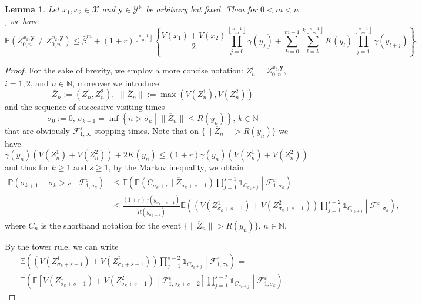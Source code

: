 \documentclass[a4paper,10pt]{article}
\newtheorem{lemma}[theorem]{Lemma}
\newcommand{\N}{\mathbb{N}}
\newcommand{\F}{\mathcal{F}}
\newcommand{\X}{\mathcal{X}}
\newcommand{\Y}{\mathcal{Y}}
\renewcommand{\P}{\mathbb{P}}
\newcommand{\E}{\mathbb{E}}
\newcommand{\ind}{\mathds{1}}
\newcommand{\eps}{\varepsilon}
\newcommand{\ga}{\gamma}
\newcommand{\lfrf}[1]{\left\lfloor #1\right\rfloor}
\begin{document}
\begin{lemma}\label{lem:coupling}
	Let $x_1,x_2\in\X$ and $\mathbf{y}\in\Y^\N$ be arbitrary but fixed. Then for $0<m<n$, we have
	$$
	\P (Z_{0,n}^{x_1,\mathbf{y}} \ne Z_{0,n}^{x_2,\mathbf{y}})
	\le
	\bar{\beta}^m
	+
	(1+r)^{\lfrf{\frac{n-1}{m}}}\left\{
	\frac{V(x_1)+V(x_2)}{2}\prod_{j=0}^{\lfrf{\frac{n-1}{m}}}\ga (y_j)
	+
	\sum_{k=0}^{m-1}\sum_{l=k}^{k\lfrf{\frac{n-1}{m}}} K(y_l)\prod_{j=1}^{\lfrf{\frac{n-1}{m}}}\ga (y_{l+j})
	\right\}.
	$$
\end{lemma}
\begin{proof}
	For the sake of brevity, we employ a more concise notation: $Z_n^i=Z_{0,n}^{x_i,\mathbf{y}}$, $i=1,2$, and $n\in\N$, moreover we introduce
	$$
	\overline{Z}_{n}:=\left(Z_n^1,Z_n^2\right), \,\,
	\lVert \overline{Z}_{n}\rVert:=\max \left( V(Z_n^1), V(Z_n^2) \right)
	$$ 
	and the sequence of successive visiting times
	$$
	\sigma_0:=0,\,\sigma_{k+1} = \inf\left\{n>\sigma_k\middle|  \lVert \overline{Z}_n\rVert\le 
	R(y_n)
	\right\},\,k\in\N
	$$
	that are obviously $\F_{1,\infty}^\eps$-stopping times. Note that on 
	$\{ \lVert \overline{Z}_n\rVert>R (y_n)\}$ we have 
	\begin{equation}\label{eq:contr}
	\ga (y_n) (V( Z_n^1)+V( Z_n^2))+2K(y_n)
	\le
	(1+r)\ga (y_n) (V( Z_n^1)+V( Z_n^2))
	\end{equation}
	and thus for $k\ge 1$ and $s\ge 1$, by the Markov inequality, we obtain
	\begin{align*}
	\P (\sigma_{k+1}-\sigma_{k}>s\mid \F_{1,\sigma_k}^\eps)
	&\le 
	\E \left(
	\P (C_{\sigma_k+s}\mid \overline{Z}_{\sigma_{k}+s-1})
	\prod_{j=1}^{s-1}
	\ind_{C_{\sigma_k+j}}
	\middle| \F_{1,\sigma_k}^\eps\right)\\
	&\le 
	\frac{(1+r)\ga (y_{\sigma_k+s-1})}{R(y_{\sigma_k+s})}
	\E \left(
	\left(V( Z_{\sigma_k+s-1}^1)+V( Z_{\sigma_k+s-1}^2)\right)
	\prod_{j=1}^{s-2}
	\ind_{C_{\sigma_k+j}}
	\middle| \F_{1,\sigma_k}^\eps\right),
	\end{align*}
	where $C_n$ is the shorthand notation for the event $\{\lVert \overline{Z}_n\rVert> 
	R(y_n)\}$, $n\in\N$. 
	
	By the tower rule, we can write
	\begin{multline*}
		\E \left(
		\left(V( Z_{\sigma_k+s-1}^1)+V( Z_{\sigma_k+s-1}^2)\right)
		\prod_{j=1}^{s-2}
		\ind_{C_{\sigma_k+j}}
		\middle| \F_{1,\sigma_k}^\eps\right)
		=\\
		\E \left(
		\E\left[V( Z_{\sigma_k+s-1}^1)+V( Z_{\sigma_k+s-1}^2)\middle|\F_{1,\sigma_{k}+s-2}^\eps\right]
		\prod_{j=1}^{s-2}
		\ind_{C_{\sigma_k+j}}
		\middle| \F_{1,\sigma_k}^\eps\right).
	\end{multline*}
	

\end{proof}
\end{document}
